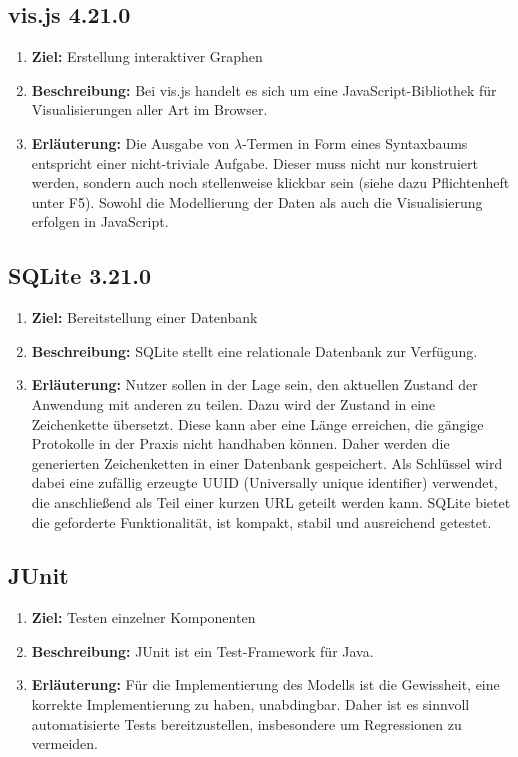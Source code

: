 \documentclass[parskip=full,11pt]{scrartcl}
\begin{document}
\subsection{vis.js 4.21.0}
\begin{enumerate}
\item[] \textbf{Ziel:} Erstellung interaktiver Graphen
\item[] \textbf{Beschreibung:} Bei vis.js handelt es sich um eine JavaScript-Bibliothek für Visualisierungen aller Art im Browser.
\item[] \textbf{Erläuterung:} Die Ausgabe von $\lambda$-Termen in Form eines Syntaxbaums entspricht einer nicht-triviale Aufgabe.
Dieser muss nicht nur konstruiert werden, sondern auch noch stellenweise klickbar sein (siehe dazu Pflichtenheft unter F5).
Sowohl die Modellierung der Daten als auch die Visualisierung erfolgen in JavaScript.
\end{enumerate}

\subsection{SQLite 3.21.0}
\begin{enumerate}
\item[] \textbf{Ziel:} Bereitstellung einer Datenbank
\item[] \textbf{Beschreibung:} SQLite stellt eine relationale Datenbank zur Verfügung.
\item[] \textbf{Erläuterung:} Nutzer sollen in der Lage sein, den aktuellen Zustand der Anwendung mit anderen zu teilen.
Dazu wird der Zustand in eine Zeichenkette übersetzt.
Diese kann aber eine Länge erreichen, die gängige Protokolle in der Praxis nicht handhaben können.
Daher werden die generierten Zeichenketten in einer Datenbank gespeichert.
Als Schlüssel wird dabei eine zufällig erzeugte UUID (Universally unique identifier) verwendet, die anschließend als Teil einer
kurzen URL geteilt werden kann.
SQLite bietet die geforderte Funktionalität, ist kompakt, stabil und ausreichend getestet.
\end{enumerate}

\subsection{JUnit}
\begin{enumerate}
\item[] \textbf{Ziel:} Testen einzelner Komponenten
\item[] \textbf{Beschreibung:} JUnit ist ein Test-Framework für Java.
\item[] \textbf{Erläuterung:} Für die Implementierung des Modells ist die Gewissheit, eine korrekte Implementierung zu haben, unabdingbar.
Daher ist es sinnvoll automatisierte Tests bereitzustellen, insbesondere um Regressionen zu vermeiden.
\end{enumerate}
\end{document}
